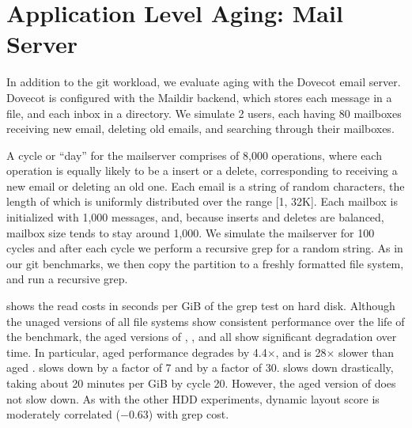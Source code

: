 \section{Application Level Aging: Mail Server}\label{sec:fsa-mailserver}
In addition to the git workload, we evaluate aging with the Dovecot email server.
Dovecot is configured with the Maildir backend, which stores each message in a file,
and each inbox in a directory.
We simulate 2 users, each having 80 mailboxes
receiving new email, deleting old emails, and searching through
their mailboxes. 

A cycle or ``day'' for the mailserver comprises of 8,000 operations, where each
operation is equally likely to be a insert or a delete, corresponding to
receiving a new email or deleting an old one. Each email is a string of random
characters, the length of which is uniformly distributed over the range [1,
32K]. Each mailbox is initialized with 1,000 messages, and, because inserts and
deletes are balanced, mailbox size tends to stay around 1,000.   We simulate the mailserver for 100 cycles and after each cycle we
perform a recursive grep for a random string. As in our git benchmarks, we then
copy the partition to a freshly formatted file system, and run a recursive
grep.

 shows the read costs in seconds per GiB of the grep test on
hard disk.  Although the unaged versions of all file systems show consistent
performance over the life of the benchmark,
the aged versions of \ext, \btrfs, \xfs and \zfs all show significant
degradation over time. In particular, aged \ext performance degrades by
4.4$\times$, and is 28$\times$ slower than aged \betrfs.
\xfs slows down by a factor of 7 and \btrfs by a factor of 30. \zfs slows down
drastically, taking about 20 minutes per GiB by cycle 20.
However, the aged version of \betrfs does not slow down. As with the other HDD
experiments, dynamic layout score is moderately correlated ($-0.63$) with grep
cost.

%

